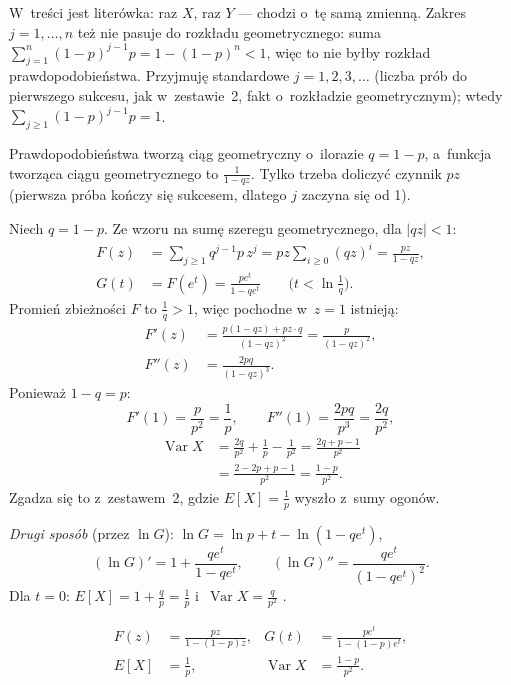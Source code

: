 \documentclass[11pt]{article}
\begin{document}
\begin{uwaga}[o~treści]
W~treści jest literówka: raz $X$, raz $Y$ --- chodzi o~tę samą zmienną.
Zakres $j=1,\dots,n$ też nie pasuje do rozkładu geometrycznego: suma
$\sum_{j=1}^n(1-p)^{j-1}p=1-(1-p)^n<1$, więc to nie byłby rozkład
prawdopodobieństwa. Przyjmuję standardowe $j=1,2,3,\dots$ (liczba prób do
pierwszego sukcesu, jak w~zestawie~2, fakt o~rozkładzie geometrycznym); wtedy
$\sum_{j\ge1}(1-p)^{j-1}p=1$.
\end{uwaga}

\begin{intuicja}
Prawdopodobieństwa tworzą ciąg geometryczny o~ilorazie $q=1-p$, a~funkcja
tworząca ciągu geometrycznego to $\frac{1}{1-qz}$. Tylko trzeba doliczyć
czynnik $pz$ (pierwsza próba kończy się sukcesem, dlatego $j$ zaczyna się
od 1).
\end{intuicja}

\formalnie
Niech $q=1-p$. Ze wzoru na sumę szeregu geometrycznego, dla $|qz|<1$:
\begin{align*}
F(z)&=\sum_{j\ge1}q^{j-1}p\,z^j=pz\sum_{i\ge0}(qz)^i=\frac{pz}{1-qz},\\
G(t)&=F(e^t)=\frac{pe^t}{1-qe^t}\qquad\bigl(t<\ln\tfrac1q\bigr).
\end{align*}
Promień zbieżności $F$ to $\frac1q>1$, więc pochodne w~$z=1$ istnieją:
\begin{align*}
F'(z)&=\frac{p(1-qz)+pz\cdot q}{(1-qz)^2}=\frac{p}{(1-qz)^2},\\
F''(z)&=\frac{2pq}{(1-qz)^3}.
\end{align*}
Ponieważ $1-q=p$:
\[
F'(1)=\frac p{p^2}=\frac1p,\qquad F''(1)=\frac{2pq}{p^3}=\frac{2q}{p^2},
\]
\begin{align*}
\operatorname{Var}X&=\frac{2q}{p^2}+\frac1p-\frac1{p^2}
=\frac{2q+p-1}{p^2}\\
&=\frac{2-2p+p-1}{p^2}=\frac{1-p}{p^2}.
\end{align*}
Zgadza się to z~zestawem~2, gdzie $E[X]=\frac1p$ wyszło z~sumy ogonów.

\emph{Drugi sposób} (przez $\ln G$): $\ln G=\ln p+t-\ln(1-qe^t)$,
\[
(\ln G)'=1+\frac{qe^t}{1-qe^t},\qquad
(\ln G)''=\frac{qe^t}{(1-qe^t)^2}.
\]
Dla $t=0$: $E[X]=1+\frac qp=\frac1p$ i~$\operatorname{Var}X=\frac q{p^2}$ \checkmark.
\begin{odpowiedz}
\begin{align*}
F(z)&=\frac{pz}{1-(1-p)z},&
G(t)&=\frac{pe^t}{1-(1-p)e^t},\\
E[X]&=\frac1p,&
\operatorname{Var}X&=\frac{1-p}{p^2}.
\end{align*}
\end{odpowiedz}
\end{document}
